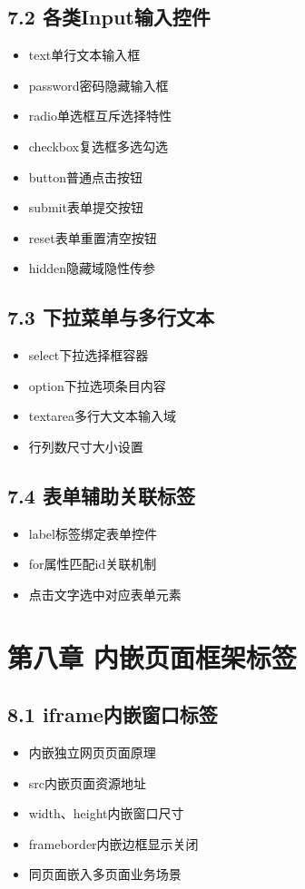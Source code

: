 \subsection{7.2 各类Input输入控件}
\begin{itemize}[leftmargin=*]
\item text单行文本输入框
\item password密码隐藏输入框
\item radio单选框互斥选择特性
\item checkbox复选框多选勾选
\item button普通点击按钮
\item submit表单提交按钮
\item reset表单重置清空按钮
\item hidden隐藏域隐性传参
\end{itemize}

\subsection{7.3 下拉菜单与多行文本}
\begin{itemize}[leftmargin=*]
\item select下拉选择框容器
\item option下拉选项条目内容
\item textarea多行大文本输入域
\item 行列数尺寸大小设置
\end{itemize}

\subsection{7.4 表单辅助关联标签}
\begin{itemize}[leftmargin=*]
\item label标签绑定表单控件
\item for属性匹配id关联机制
\item 点击文字选中对应表单元素
\end{itemize}

\section{第八章 内嵌页面框架标签}
\subsection{8.1 iframe内嵌窗口标签}
\begin{itemize}[leftmargin=*]
\item 内嵌独立网页页面原理
\item src内嵌页面资源地址
\item width、height内嵌窗口尺寸
\item frameborder内嵌边框显示关闭
\item 同页面嵌入多页面业务场景
\end{itemize}

